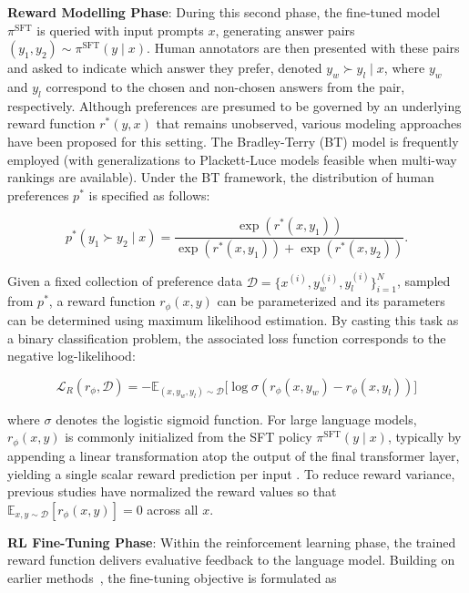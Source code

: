\textbf{Reward Modelling Phase}: During this second phase, the fine-tuned model $\pi^\text{SFT}$ is queried with input prompts $x$, generating answer pairs $(y_1, y_2)\sim \pi^\text{SFT}(y \mid x)$. Human annotators are then presented with these pairs and asked to indicate which answer they prefer, denoted $y_w\succ y_l \mid x$, where $y_w$ and $y_l$ correspond to the chosen and non-chosen answers from the pair, respectively. Although preferences are presumed to be governed by an underlying reward function $r^*(y, x)$ that remains unobserved, various modeling approaches have been proposed for this setting. The Bradley-Terry (BT) model \cite{bradley1952rankanalysis} is frequently employed (with generalizations to Plackett-Luce models \citep{plackett1975analysis, luce2012individual} feasible when multi-way rankings are available). Under the BT framework, the distribution of human preferences $p^*$ is specified as follows:

\begin{equation}\label{eq:bradley-terry}
    p^*(y_1\succ y_2 \mid x)=\frac{\exp\left(r^*(x, y_1)\right)}{\exp\left(r^*(x, y_1)\right) + \exp\left(r^*(x, y_2)\right)}.
\end{equation}

Given a fixed collection of preference data $\mathcal{D}=\bigl\{x^{(i)}, y_w^{(i)}, y_l^{(i)}\bigr\}_{i=1}^N$, sampled from $p^*$, a reward function $r_{\phi}(x, y)$ can be parameterized and its parameters can be determined using maximum likelihood estimation. By casting this task as a binary classification problem, the associated loss function corresponds to the negative log-likelihood:

\begin{equation}\label{eq:reward_model}
    \mathcal{L}_R(r_{\phi}, \mathcal{D}) = -\mathbb{E}_{(x, y_w, y_l)\sim \mathcal{D}}\bigl[\log \sigma(r_{\phi}(x, y_w)- r_{\phi}(x, y_l))\bigr]
\end{equation}

where $\sigma$ denotes the logistic sigmoid function. For large language models, $r_{\phi}(x, y)$ is commonly initialized from the SFT policy $\pi^\text{SFT}(y \mid x)$, typically by appending a linear transformation atop the output of the final transformer layer, yielding a single scalar reward prediction per input \cite{ziegler2020finetuning}. To reduce reward variance, previous studies have normalized the reward values so that $\mathbb{E}_{x,y\sim \mathcal{D}}\left[r_\phi(x, y)\right] = 0$ across all $x$.

\textbf{RL Fine-Tuning Phase}: Within the reinforcement learning phase, the trained reward function delivers evaluative feedback to the language model. Building on earlier methods~\citep{jaques2017sequence, jaques2020human}, the fine-tuning objective is formulated as

